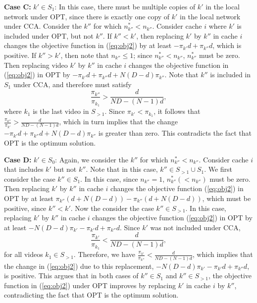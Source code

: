 \documentclass[conference]{IEEEtran}
\begin{document}
\noindent \textbf{Case C:} \underline{$k' \in S_1$}: 
In this case, there must be multiple copies of $k'$ in the local network under OPT, since there is exactly one copy of $k'$ in the local network under CCA. 
Consider the $k''$ for which $n^*_{k''} < n_{k''}$. 
Consider cache $i$ where $k'$ is included under OPT, but not $k''$. If $k'' < k'$, then replacing $k'$ by $k''$ in cache $i$ changes the objective function in (\ref{eq:obj2}) by at least $-\pi_{k'} d +\pi_{k''} d$, which is positive. If $k'' > k'$, then note that $n_{k''} \leq 1$; since $n^*_{k''} < n_{k''}$, $n^*_{k''}$ must be zero. Then replacing video $k'$ by $k''$ in cache $i$ changes the objective function in (\ref{eq:obj2}) in OPT by $-\pi_{k'} d + \pi_{k''} d + N (D-d) \pi_{k''}$. Note that $k''$ is included in $S_1$ under CCA, and therefore must satisfy 
\begin{equation}
\frac{\pi_{k''}}{\pi_{k_1}} > \frac{d}{ND - (N-1)d},
\label{eq:case_c}
\end{equation}
where $k_1$ is the last video in $S_{>1}$. Since $\pi_{k'} < \pi_{k_1}$, it follows that $\frac{\pi_{k''}}{\pi_{k'}} > \frac{d}{ND - (N-1)d}$, which in turn implies that the change $-\pi_{k'} d + \pi_{k''} d + N (D-d) \pi_{k''}$ is greater than zero. This contradicts the fact that OPT is the optimum solution.

\noindent \textbf{Case D:} \underline{$k' \in S_0$}: Again, we consider the $k''$ for which $n^*_{k''} < n_{k''}$. Consider cache $i$ that includes $k'$ but not $k''$. Note that in this case, $k'' \in S_{>1} \cup S_1$. We first consider the case $k'' \in S_1$. In this case, since $n_{k''} =1$, $n^*_{k''} (< n_{k''})$ must be zero. Then replacing $k'$ by $k''$ in cache $i$ changes the objective function (\ref{eq:obj2}) in OPT by at least $\pi_{k''} (d  + N(D-d)) - \pi_{k''} (d  + N(D-d))$, which must be positive, since $k'' < k'$. Now the consider the case $k'' \in S_{>1}$. In this case, replacing $k'$ by $k''$ in cache $i$ changes the objective function (\ref{eq:obj2}) in OPT by at least $-N(D-d) \pi_{k'} - \pi_{k'}d + \pi_{k''}d$. Since $k'$ was not included under CCA, 
\begin{equation}
\frac{\pi_{k'}}{\pi_{k_1}} < \frac{d}{ND - (N-1)d},
\label{eq:case_d}
\end{equation}
for all videos $k_1 \in S_{>1}$. Therefore, we have $\frac{\pi_{k'}}{\pi_{k''}} < \frac{d}{ND - (N-1)d}$, which implies that the change in (\ref{eq:obj2}) due to this replacement, $-N(D-d) \pi_{k'} - \pi_{k'}d + \pi_{k''}d$, is positive. This argues that in both cases of $k'' \in S_1$ and $k'' \in S_{>1}$, the objective function in (\ref{eq:obj2}) under OPT improves by replacing $k'$ in cache $i$ by $k''$, contradicting the fact that OPT is the optimum solution.
\end{document}
